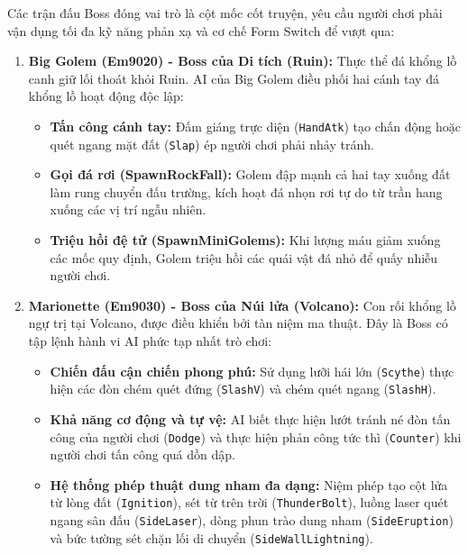 \documentclass[../DoAn.tex]{subfiles}
\begin{document}
Các trận đấu Boss đóng vai trò là cột mốc cốt truyện, yêu cầu người chơi phải vận dụng tối đa kỹ năng phản xạ và cơ chế Form Switch để vượt qua:
\begin{enumerate}
    \item \textbf{Big Golem (Em9020) - Boss của Di tích (Ruin):} 
    Thực thể đá khổng lồ canh giữ lối thoát khỏi Ruin. AI của Big Golem điều phối hai cánh tay đá khổng lồ hoạt động độc lập:
    \begin{itemize}
        \item \textbf{Tấn công cánh tay:} Đấm giáng trực diện (\texttt{HandAtk}) tạo chấn động hoặc quét ngang mặt đất (\texttt{Slap}) ép người chơi phải nhảy tránh.
        \item \textbf{Gọi đá rơi (SpawnRockFall):} Golem đập mạnh cả hai tay xuống đất làm rung chuyển đấu trường, kích hoạt đá nhọn rơi tự do từ trần hang xuống các vị trí ngẫu nhiên.
        \item \textbf{Triệu hồi đệ tử (SpawnMiniGolems):} Khi lượng máu giảm xuống các mốc quy định, Golem triệu hồi các quái vật đá nhỏ để quấy nhiễu người chơi.
    \end{itemize}
    \item \textbf{Marionette (Em9030) - Boss của Núi lửa (Volcano):} 
    Con rối khổng lồ ngự trị tại Volcano, được điều khiển bởi tàn niệm ma thuật. Đây là Boss có tập lệnh hành vi AI phức tạp nhất trò chơi:
    \begin{itemize}
        \item \textbf{Chiến đấu cận chiến phong phú:} Sử dụng lưỡi hái lớn (\texttt{Scythe}) thực hiện các đòn chém quét đứng (\texttt{SlashV}) và chém quét ngang (\texttt{SlashH}).
        \item \textbf{Khả năng cơ động và tự vệ:} AI biết thực hiện lướt tránh né đòn tấn công của người chơi (\texttt{Dodge}) và thực hiện phản công tức thì (\texttt{Counter}) khi người chơi tấn công quá dồn dập.
        \item \textbf{Hệ thống phép thuật dung nham đa dạng:} Niệm phép tạo cột lửa từ lòng đất (\texttt{Ignition}), sét từ trên trời (\texttt{ThunderBolt}), luồng laser quét ngang sân đấu (\texttt{SideLaser}), dòng phun trào dung nham (\texttt{SideEruption}) và bức tường sét chặn lối di chuyển (\texttt{SideWallLightning}).
    \end{itemize}
\end{enumerate}

\end{document}
